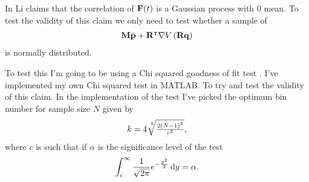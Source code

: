 In \citep{Li2010} Li claims that the correlation of $\mathbf{F}(t)$ is a Gaussian process with 0 mean. To test the validity of this claim we only need to test whether a sample of \begin{align*}
\mathbf{M}\dot{\mathbf{p}}+\mathbf{R}^{\intercal}\nabla V\left(\mathbf{R}\mathbf{q}\right)
\end{align*}
is normally distributed. 

To test this I'm going to be using a Chi squared goodness of fit test \cite{Taeger2014}. I've implemented my own Chi squared test in MATLAB. To try and test the validity of this claim. In the implementation of the test I've picked the optimum bin number\cite{Hald2006}\cite{Jr.1950} for sample size $N$ given by 
\begin{align*}
k = 4 \sqrt[\leftroot{-3}\uproot{3}5]{\tfrac{2\left(N-1\right)^2}{c^2}},
\end{align*}
where $c$ is such that if $\alpha$ is the significance level of the test 
\begin{align*}
\int_{c}^{\infty} \frac{1}{\sqrt{2\pi}} e^{-\frac{y^{2}}{2}} \mathop{}\!\mathrm{d} y = \alpha.
\end{align*}